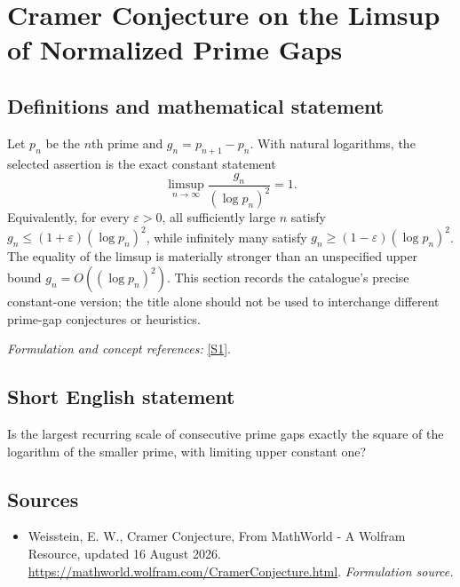 \documentclass[11pt]{article}
\begin{document}
\section*{\texorpdfstring{Cramer Conjecture on the Limsup of Normalized Prime Gaps}{Cramer Conjecture on the Limsup of Normalized Prime Gaps}}\label{160}
\subsection{Definitions and mathematical statement}
Let $p_n$ be the $n$th prime and $g_n=p_{n+1}-p_n$. With natural logarithms, the selected assertion is the exact constant statement
\[
 \limsup_{n\to\infty}\frac{g_n}{(\log p_n)^2}=1.
\]
Equivalently, for every ${\varepsilon}>0$, all sufficiently large $n$ satisfy
$g_n\le(1+{\varepsilon})(\log p_n)^2$, while infinitely many satisfy
$g_n\ge(1-{\varepsilon})(\log p_n)^2$. The equality of the limsup is materially stronger than an unspecified upper bound $g_n=O((\log p_n)^2)$. This section records the catalogue's precise constant-one version; the title alone should not be used to interchange different prime-gap conjectures or heuristics.
\par\smallskip\textit{Formulation and concept references:} \href{https://mathworld.wolfram.com/CramerConjecture.html}{[S1]}.

\subsection{Short English statement}
Is the largest recurring scale of consecutive prime gaps exactly the square of the logarithm of the smaller prime, with limiting upper constant one?
\subsection{Sources}
\begin{itemize}
\item[S1]Weisstein, E. W., Cramer Conjecture, From MathWorld - A Wolfram Resource, updated 16 August 2026.
\url{https://mathworld.wolfram.com/CramerConjecture.html}.
\textit{Formulation source.}
\end{itemize}
\end{document}
